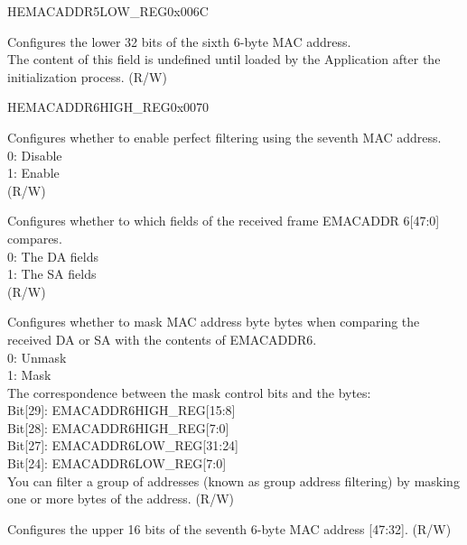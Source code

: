 \begin{register}{H}{EMACADDR5LOW\_REG}{0x006C}\label{regdesc:EMACADDR5LOWREG}
%
\regnewline%
\begin{regdesc}\begin{reglist}
\item [EMACADDR5LOW\_REG] Configures the lower 32 bits of the sixth 6-byte MAC address.\\The content of this field is undefined until loaded by the Application after the initialization process. (R/W)
\end{reglist}\end{regdesc}
\end{register}

\begin{register}{H}{EMACADDR6HIGH\_REG}{0x0070}\label{regdesc:EMACADDR6HIGHREG}
%
%
%
%
%
\regnewline%
\begin{regdesc}\begin{reglist}
\item [ADDRESS\_ENABLE6] Configures whether to enable perfect filtering using the seventh MAC address.\\
0: Disable\\
1: Enable\\ (R/W)
\item [SOURCE\_ADDRESS6] Configures whether to which fields of the received frame EMACADDR 6[47:0] compares.\\
0: The DA fields\\
1: The SA fields\\ (R/W)
\item [MASK\_BYTE\_CONTROL6] Configures whether to mask MAC address byte bytes when comparing the received DA or SA with the contents of EMACADDR6.\\
0: Unmask\\
1: Mask\\
The correspondence between the mask control bits and the bytes:\\
Bit[29]: EMACADDR6HIGH\_REG[15:8]\\
Bit[28]: EMACADDR6HIGH\_REG[7:0]\\
Bit[27]: EMACADDR6LOW\_REG[31:24]\\
Bit[24]: EMACADDR6LOW\_REG[7:0]\\
You can filter a group of addresses (known as group address filtering) by masking one or more bytes of the address. (R/W)
\item [MAC\_ADDRESS6\_HI] Configures the upper 16 bits of the seventh 6-byte MAC address [47:32]. (R/W)
\end{reglist}\end{regdesc}
\end{register}

